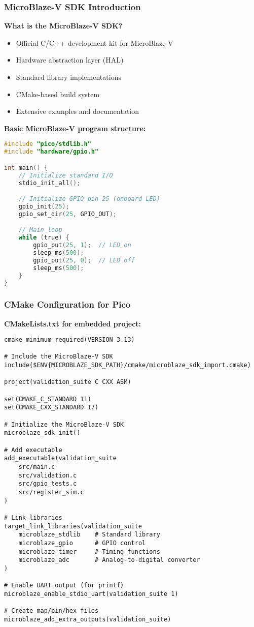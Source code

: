 \documentclass{beamer}
\begin{document}
\begin{frame}[fragile]
\frametitle{MicroBlaze-V SDK Introduction}
\textbf{What is the MicroBlaze-V SDK?}
\begin{itemize}
    \item Official C/C++ development kit for MicroBlaze-V
    \item Hardware abstraction layer (HAL)
    \item Standard library implementations
    \item CMake-based build system
    \item Extensive examples and documentation
\end{itemize}

\textbf{Basic MicroBlaze-V program structure:}
\begin{lstlisting}[language=C]
#include "pico/stdlib.h"
#include "hardware/gpio.h"

int main() {
    // Initialize standard I/O
    stdio_init_all();

    // Initialize GPIO pin 25 (onboard LED)
    gpio_init(25);
    gpio_set_dir(25, GPIO_OUT);

    // Main loop
    while (true) {
        gpio_put(25, 1);  // LED on
        sleep_ms(500);
        gpio_put(25, 0);  // LED off
        sleep_ms(500);
    }
}
\end{lstlisting}
\end{frame}

\begin{frame}[fragile]
\frametitle{CMake Configuration for Pico}
\textbf{CMakeLists.txt for embedded project:}
\begin{lstlisting}[basicstyle=\tiny]
cmake_minimum_required(VERSION 3.13)

# Include the MicroBlaze-V SDK
include($ENV{MICROBLAZE_SDK_PATH}/cmake/microblaze_sdk_import.cmake)

project(validation_suite C CXX ASM)

set(CMAKE_C_STANDARD 11)
set(CMAKE_CXX_STANDARD 17)

# Initialize the MicroBlaze-V SDK
microblaze_sdk_init()

# Add executable
add_executable(validation_suite
    src/main.c
    src/validation.c
    src/gpio_tests.c
    src/register_sim.c
)

# Link libraries
target_link_libraries(validation_suite
    microblaze_stdlib    # Standard library
    microblaze_gpio      # GPIO control
    microblaze_timer     # Timing functions
    microblaze_adc       # Analog-to-digital converter
)

# Enable UART output (for printf)
microblaze_enable_stdio_uart(validation_suite 1)

# Create map/bin/hex files
microblaze_add_extra_outputs(validation_suite)
\end{lstlisting}
\end{frame}
\end{document}
